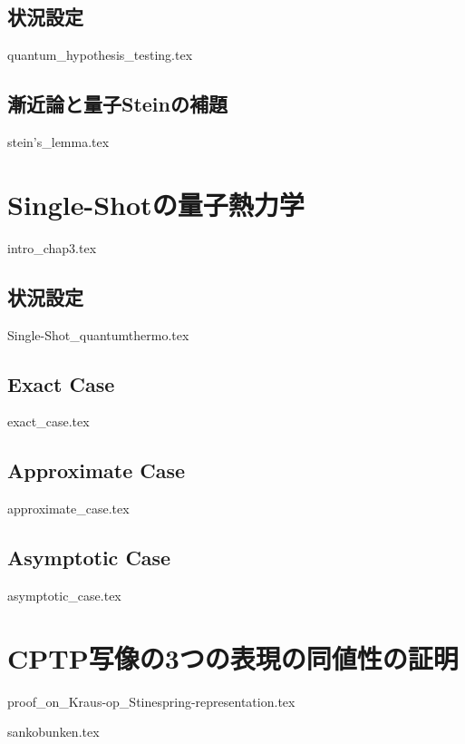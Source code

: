 \documentclass[report]{jlreq}
\begin{document}
\section{状況設定}
{quantum_hypothesis_testing.tex}
\section{漸近論と量子Steinの補題}
{stein's_lemma.tex}

\chapter{Single-Shotの量子熱力学}\label{chap.single-shot_quantumthermo}
{intro_chap3.tex}

\section{状況設定}\label{sec.Single-Shot_quantumthermo}
{Single-Shot_quantumthermo.tex}
\section{Exact Case}
{exact_case.tex}
\section{Approximate Case}
{approximate_case.tex}
\section{Asymptotic Case}
{asymptotic_case.tex}



\pagestyle{TOC}
\appendix
\chapter{CPTP写像の3つの表現の同値性の証明}
{proof_on_Kraus-op_Stinespring-representation.tex}
  
{sankobunken.tex}
  
\end{document}
